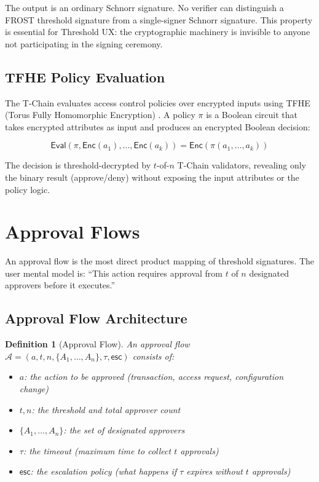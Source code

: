 \documentclass[11pt,a4paper]{article}
\newtheorem{definition}{Definition}
\begin{document}
The output is an ordinary Schnorr signature. No verifier can distinguish
a FROST threshold signature from a single-signer Schnorr signature. This
property is essential for Threshold UX: the cryptographic machinery is
invisible to anyone not participating in the signing ceremony.

\subsection{TFHE Policy Evaluation}

The T-Chain evaluates access control policies over encrypted inputs using
TFHE (Torus Fully Homomorphic Encryption) \cite{chillotti2020tfhe}. A
policy $\pi$ is a Boolean circuit that takes encrypted attributes as input
and produces an encrypted Boolean decision:

\begin{equation}
    \mathsf{Eval}(\pi, \mathsf{Enc}(a_1), \ldots, \mathsf{Enc}(a_k)) = \mathsf{Enc}(\pi(a_1, \ldots, a_k))
\end{equation}

The decision is threshold-decrypted by $t$-of-$n$ T-Chain validators,
revealing only the binary result (approve/deny) without exposing the
input attributes or the policy logic.

\section{Approval Flows}\label{sec:approval}

An approval flow is the most direct product mapping of threshold signatures.
The user mental model is: ``This action requires approval from $t$ of $n$
designated approvers before it executes.''

\subsection{Approval Flow Architecture}

\begin{definition}[Approval Flow]
An approval flow $\mathcal{A} = (a, t, n, \{A_1, \ldots, A_n\}, \tau, \mathsf{esc})$
consists of:
\begin{itemize}
    \item $a$: the action to be approved (transaction, access request, configuration change)
    \item $t, n$: the threshold and total approver count
    \item $\{A_1, \ldots, A_n\}$: the set of designated approvers
    \item $\tau$: the timeout (maximum time to collect $t$ approvals)
    \item $\mathsf{esc}$: the escalation policy (what happens if $\tau$ expires without $t$ approvals)
\end{itemize}
\end{definition}
\end{document}
